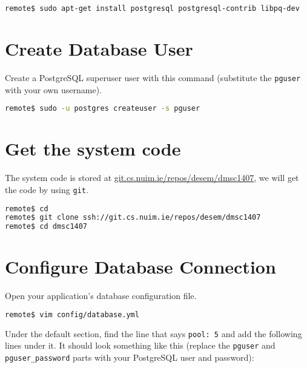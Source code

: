 \begin{minipage}{\linewidth}
\begin{lstlisting}[language=bash]
remote$ sudo apt-get install postgresql postgresql-contrib libpq-dev
\end{lstlisting}
\end{minipage}

\section{Create Database User}

Create a PostgreSQL superuser user with this command
(substitute the \texttt{pguser} with your own username).

\begin{minipage}{\linewidth}
\begin{lstlisting}[language=bash]
remote$ sudo -u postgres createuser -s pguser
\end{lstlisting}
\end{minipage}

\section{Get the system code}

The system code is stored at \url{git.cs.nuim.ie/repos/desem/dmsc1407},
we will get the code by using \texttt{git}.

\begin{minipage}{\linewidth}
\begin{lstlisting}[language=bash]
remote$ cd
remote$ git clone ssh://git.cs.nuim.ie/repos/desem/dmsc1407
remote$ cd dmsc1407
\end{lstlisting}
\end{minipage}

\section{Configure Database Connection}

Open your application's database configuration file.

\begin{minipage}{\linewidth}
\begin{lstlisting}[language=bash]
remote$ vim config/database.yml
\end{lstlisting}
\end{minipage}

Under the default section, find the line that says \texttt{pool: 5}
and add the following lines under it. It should look something like this
(replace the \texttt{pguser} and \texttt{pguser\_password}
parts with your PostgreSQL user and password):

